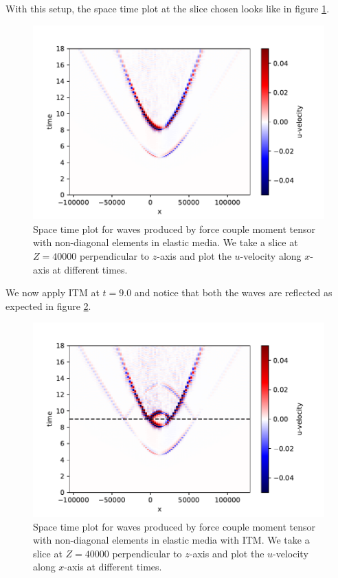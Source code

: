 With this setup, the space time plot at the slice chosen looks like in figure \ref{fig:space-timeplot-doublecoupletorinoITM}.

\begin{figure}[!htpb]
    \centering
    \includegraphics[width=0.8\linewidth]{figures/double-couple-tori-noITM.pdf}
    \caption{Space time plot for waves produced by force couple moment tensor with non-diagonal elements in elastic media. We take a slice at $Z=40000$ perpendicular to $z$-axis and plot the $u$-velocity along $x$-axis at different times.}
    \label{fig:space-timeplot-doublecoupletorinoITM}
\end{figure}

We now apply \ac{ITM} at $t=9.0$ and notice that both the waves are reflected as expected in figure \ref{fig:space-timeplot-doublecoupletoriITM}.

\begin{figure}[!htpb]
    \centering
    \includegraphics[width=0.75\linewidth]{figures/double-couple-tori2.pdf}
    \caption{Space time plot for waves produced by force couple moment tensor with non-diagonal elements in elastic media with \ac{ITM}. We take a slice at $Z=40000$ perpendicular to $z$-axis and plot the $u$-velocity along $x$-axis at different times.}
    \label{fig:space-timeplot-doublecoupletoriITM}
\end{figure}

